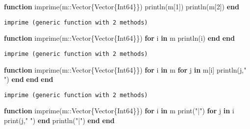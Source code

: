 \documentclass[
  letterpaper,
  DIV=11,
  numbers=noendperiod]{scrreprt}
\newenvironment{Shaded}{\begin{snugshade}}{\end{snugshade}}
\newcommand{\ControlFlowTok}[1]{\textcolor[rgb]{0.00,0.23,0.31}{\textbf{#1}}}
\newcommand{\DataTypeTok}[1]{\textcolor[rgb]{0.68,0.00,0.00}{#1}}
\newcommand{\FloatTok}[1]{\textcolor[rgb]{0.68,0.00,0.00}{#1}}
\newcommand{\FunctionTok}[1]{\textcolor[rgb]{0.28,0.35,0.67}{#1}}
\newcommand{\KeywordTok}[1]{\textcolor[rgb]{0.00,0.23,0.31}{\textbf{#1}}}
\newcommand{\NormalTok}[1]{\textcolor[rgb]{0.00,0.23,0.31}{#1}}
\newcommand{\OperatorTok}[1]{\textcolor[rgb]{0.37,0.37,0.37}{#1}}
\newcommand{\StringTok}[1]{\textcolor[rgb]{0.13,0.47,0.30}{#1}}
\begin{document}
\begin{Shaded}
\begin{Highlighting}[]
\KeywordTok{function} \FunctionTok{imprime}\NormalTok{(m}\OperatorTok{::}\DataTypeTok{Vector\{Vector\{Int64\}\}}\NormalTok{)}
    \FunctionTok{println}\NormalTok{(m[}\FloatTok{1}\NormalTok{])}
    \FunctionTok{println}\NormalTok{(m[}\FloatTok{2}\NormalTok{])}
\KeywordTok{end}
\end{Highlighting}
\end{Shaded}

\begin{verbatim}
imprime (generic function with 2 methods)
\end{verbatim}

\begin{Shaded}
\begin{Highlighting}[]
\KeywordTok{function} \FunctionTok{imprime}\NormalTok{(m}\OperatorTok{::}\DataTypeTok{Vector\{Vector\{Int64\}\}}\NormalTok{)}
    \ControlFlowTok{for}\NormalTok{ i }\KeywordTok{in}\NormalTok{ m}
        \FunctionTok{println}\NormalTok{(i)}
    \ControlFlowTok{end}
 \KeywordTok{end}
\end{Highlighting}
\end{Shaded}

\begin{verbatim}
imprime (generic function with 2 methods)
\end{verbatim}

\begin{Shaded}
\begin{Highlighting}[]
\KeywordTok{function} \FunctionTok{imprime}\NormalTok{(m}\OperatorTok{::}\DataTypeTok{Vector\{Vector\{Int64\}\}}\NormalTok{)}
    \ControlFlowTok{for}\NormalTok{ i }\KeywordTok{in}\NormalTok{ m}
        \ControlFlowTok{for}\NormalTok{ j }\KeywordTok{in}\NormalTok{ m[i]}
            \FunctionTok{println}\NormalTok{(j,}\StringTok{"  "}\NormalTok{)}
        \ControlFlowTok{end}   
    \ControlFlowTok{end}
\KeywordTok{end}
\end{Highlighting}
\end{Shaded}

\begin{verbatim}
imprime (generic function with 2 methods)
\end{verbatim}

\begin{Shaded}
\begin{Highlighting}[]
\KeywordTok{function} \FunctionTok{imprime}\NormalTok{(m}\OperatorTok{::}\DataTypeTok{Vector\{Vector\{Int64\}\}}\NormalTok{)}
    \ControlFlowTok{for}\NormalTok{ i }\KeywordTok{in}\NormalTok{ m}
        \FunctionTok{print}\NormalTok{(}\StringTok{"|"}\NormalTok{)}
        \ControlFlowTok{for}\NormalTok{ j }\KeywordTok{in}\NormalTok{ i}
            \FunctionTok{print}\NormalTok{(j,}\StringTok{"  "}\NormalTok{)}
        \ControlFlowTok{end}
        \FunctionTok{println}\NormalTok{(}\StringTok{"|"}\NormalTok{)   }
    \ControlFlowTok{end}
\KeywordTok{end}
\end{Highlighting}
\end{Shaded}
\end{document}
